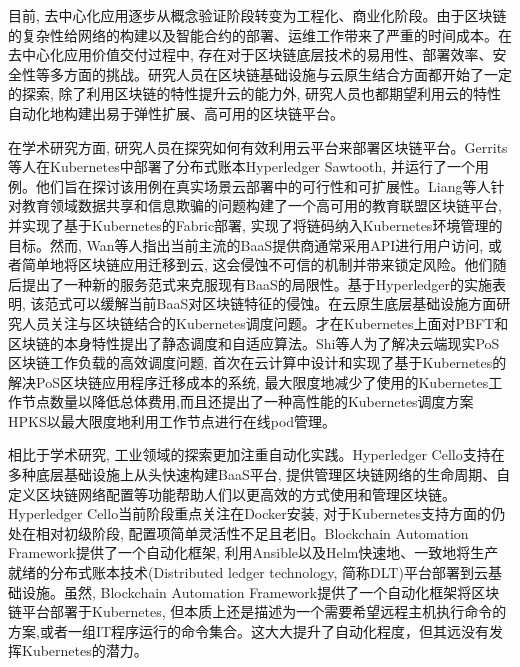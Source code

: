 目前, 去中心化应用逐步从概念验证阶段转变为工程化、商业化阶段。由于区块链的复杂性给网络的构建以及智能合约的部署、运维工作带来了严重的时间成本。在去中心化应用价值交付过程中, 存在对于区块链底层技术的易用性、部署效率、安全性等多方面的挑战。研究人员在区块链基础设施与云原生结合方面都开始了一定的探索, 除了利用区块链的特性提升云的能力外\cite{DBLP:journals/comcom/XieZZWH21}\cite{DBLP:conf/smartcloud/SunWY20}\cite{8457813}, 研究人员也都期望利用云的特性自动化地构建出易于弹性扩展、高可用的区块链平台。

在学术研究方面, 研究人员在探究如何有效利用云平台来部署区块链平台。Gerrits等人\cite{DBLP:conf/coins/GerritsKKFV21}在Kubernetes中部署了分布式账本Hyperledger Sawtooth\footnotemark[1], 并运行了一个用例。他们旨在探讨该用例在真实场景云部署中的可行性和可扩展性。Liang等人\cite{liangeduchain}针对教育领域数据共享和信息欺骗的问题构建了一个高可用的教育联盟区块链平台, 并实现了基于Kubernetes的Fabric部署, 实现了将链码纳入Kubernetes环境管理的目标。然而, Wan等人\cite{wan2018novel}指出当前主流的BaaS提供商通常采用API进行用户访问, 或者简单地将区块链应用迁移到云, 这会侵蚀不可信的机制并带来锁定风险。他们随后提出了一种新的服务范式来克服现有BaaS的局限性。基于Hyperledger的实施表明, 该范式可以缓解当前BaaS对区块链特征的侵蚀。在云原生底层基础设施方面研究人员关注与区块链结合的Kubernetes调度问题。才\cite{caili2018}在Kubernetes上面对PBFT和区块链的本身特性提出了静态调度和自适应算法。Shi等人\cite{9582270}为了解决云端现实PoS区块链工作负载的高效调度问题, 首次在云计算中设计和实现了基于Kubernetes的解决PoS区块链应用程序迁移成本的系统, 最大限度地减少了使用的Kubernetes工作节点数量以降低总体费用,而且还提出了一种高性能的Kubernetes调度方案HPKS以最大限度地利用工作节点进行在线pod管理。

相比于学术研究, 工业领域的探索更加注重自动化实践。Hyperledger Cello\footnotemark[1]支持在多种底层基础设施上从头快速构建BaaS平台, 提供管理区块链网络的生命周期、自定义区块链网络配置等功能帮助人们以更高效的方式使用和管理区块链。Hyperledger Cello当前阶段重点关注在Docker安装, 对于Kubernetes支持方面的仍处在相对初级阶段, 配置项简单灵活性不足且老旧。Blockchain Automation Framework\footnotemark[2]提供了一个自动化框架, 利用Ansible\footnotemark[3]以及Helm\footnotemark[4]快速地、一致地将生产就绪的分布式账本技术(Distributed ledger technology, 简称DLT)平台部署到云基础设施。虽然, Blockchain Automation Framework提供了一个自动化框架将区块链平台部署于Kubernetes, 但本质上还是描述为一个需要希望远程主机执行命令的方案,或者一组IT程序运行的命令集合。这大大提升了自动化程度，但其远没有发挥Kubernetes的潜力。

